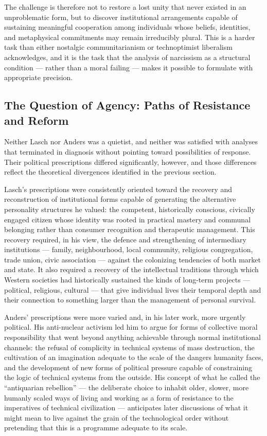 \documentclass[12pt]{memoir}
\begin{document}
The challenge is therefore not to restore a lost unity that never existed in an
unproblematic form, but to discover institutional arrangements capable of sustaining
meaningful cooperation among individuals whose beliefs, identities, and metaphysical
commitments may remain irreducibly plural. This is a harder task than either
nostalgic communitarianism or technoptimist liberalism acknowledges, and it is the
task that the analysis of narcissism as a structural condition — rather than a moral
failing — makes it possible to formulate with appropriate precision.

\subsection{The Question of Agency: Paths of Resistance and Reform}

Neither Lasch nor Anders was a quietist, and neither was satisfied with analyses that
terminated in diagnosis without pointing toward possibilities of response. Their political
prescriptions differed significantly, however, and those differences reflect the theoretical
divergences identified in the previous section.

Lasch's prescriptions were consistently oriented toward the recovery and reconstruction of
institutional forms capable of generating the alternative personality structures he valued:
the competent, historically conscious, civically engaged citizen whose identity was rooted in
practical mastery and communal belonging rather than consumer recognition and therapeutic
management. This recovery required, in his view, the defence and strengthening of intermediary
institutions — family, neighbourhood, local community, religious congregation, trade union,
civic association — against the colonizing tendencies of both market and state. It also
required a recovery of the intellectual traditions through which Western societies had
historically sustained the kinds of long-term projects — political, religious, cultural — that
give individual lives their temporal depth and their connection to something larger than the
management of personal survival.

Anders' prescriptions were more varied and, in his later work, more urgently political. His
anti-nuclear activism led him to argue for forms of collective moral responsibility that went
beyond anything achievable through normal institutional channels: the refusal of complicity in
technical systems of mass destruction, the cultivation of an imagination adequate to the scale
of the dangers humanity faces, and the development of new forms of political pressure capable
of constraining the logic of technical systems from the outside. His concept of what he called
the \enquote{antiquarian rebellion} — the deliberate choice to inhabit older, slower, more
humanly scaled ways of living and working as a form of resistance to the imperatives of
technical civilization — anticipates later discussions of what it might mean to live against
the grain of the technological order without pretending that this is a programme adequate to
its scale.\citep[cf.][]{anders1982hiroshima}
\end{document}
